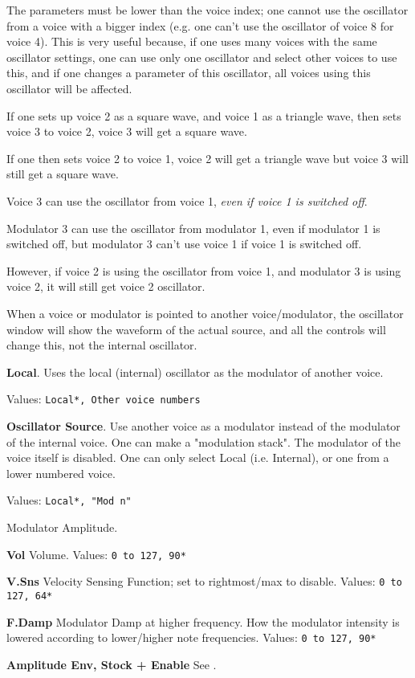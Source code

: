    The parameters must be lower than the voice index; one cannot use the
   oscillator from a voice with a bigger index (e.g. one can't use the
   oscillator of voice 8 for voice 4). This is very useful because, if
   one uses many voices with the same oscillator settings, one can use only
   one oscillator and select other voices to use this, and if one changes a
   parameter of this oscillator, all voices using this oscillator will be
   affected.

   If one sets up voice 2 as a square wave, and voice 1 as a triangle wave,
   then sets voice 3 to voice 2, voice 3 will get a square wave.

   If one then sets voice 2 to voice 1, voice 2 will get a triangle wave but
   voice 3 will still get a square wave.

   Voice 3 can use the oscillator from voice 1,
   \textsl{even if voice 1 is switched off}.

   Modulator 3 can use the oscillator from modulator 1, even if modulator 1 is
   switched off, but modulator 3 can't use voice 1 if voice 1 is
   switched off.

   However, if voice 2 is using the oscillator from voice 1, and modulator 3 is
   using voice 2, it will still get voice 2 oscillator.

   When a voice or modulator is pointed to another voice/modulator, the
   oscillator window will show the waveform of the actual source, and all the
   controls will change this, not the internal oscillator.

   \textbf{Local}.
   Uses the local (internal) oscillator as the modulator of another voice.

   Values: \texttt{Local*, Other voice numbers}

   \textbf{Oscillator Source}.
   Use another voice as a modulator instead of the modulator of the internal
   voice. One can make a "modulation stack". The modulator of the voice itself
   is disabled.
   One can only select Local (i.e. Internal), or one from a lower numbered voice.

   Values: \texttt{Local*, "Mod n"}

   Modulator Amplitude.

   \begin{enumber}
      \item \textbf{Vol}
         Volume.
         Values: \texttt{0 to 127, 90*}
      \item \textbf{V.Sns}
         Velocity Sensing Function; set to rightmost/max to disable.
         Values: \texttt{0 to 127, 64*}
      \item \textbf{F.Damp}
         Modulator Damp at higher frequency.
         How the modulator intensity is lowered according to lower/higher
         note frequencies.
         Values: \texttt{0 to 127, 90*}
      \item \textbf{Amplitude Env, Stock + Enable}
         See .
   \end{enumber}

